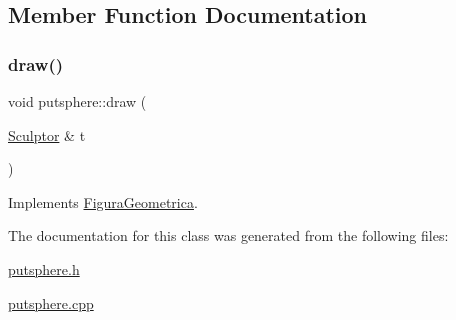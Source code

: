 \subsection{Member Function Documentation}
\mbox{\label{classputsphere_afb72d04545c9a049d82d6faa5cb18954}} 
\subsubsection{\texorpdfstring{draw()}{draw()}}
{\footnotesize\ttfamily void putsphere\+::draw (\begin{DoxyParamCaption}\item[{\mbox{\hyperlink{class_sculptor}{Sculptor}} \&}]{t }\end{DoxyParamCaption})\hspace{0.3cm}{\ttfamily [virtual]}}



Implements \mbox{\hyperlink{class_figura_geometrica_a34585fd7c0bd7378fc69c4ee208e676c}{Figura\+Geometrica}}.



The documentation for this class was generated from the following files\+:\begin{DoxyCompactItemize}
\item 
\mbox{\hyperlink{putsphere_8h}{putsphere.\+h}}\item 
\mbox{\hyperlink{putsphere_8cpp}{putsphere.\+cpp}}\end{DoxyCompactItemize}
